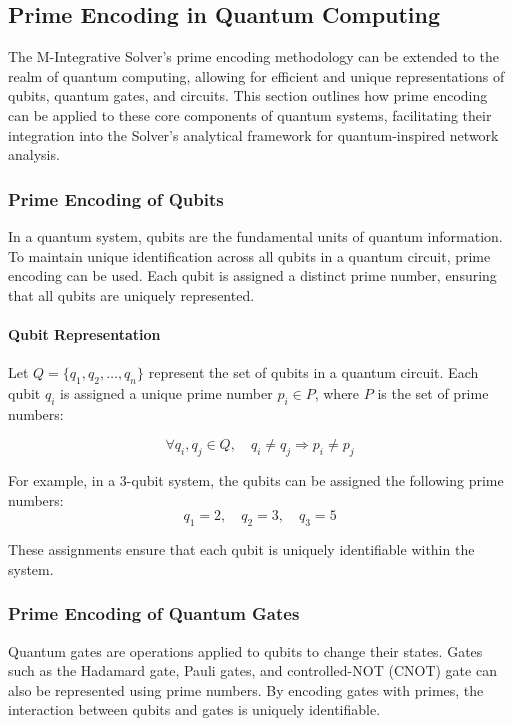 \documentclass[%
 preprint, linenumbers,
 amsmath,amssymb,
 aps, physrev,
]{revtex4-2}
\begin{document}
\subsection{Prime Encoding in Quantum Computing}

The M-Integrative Solver’s prime encoding methodology can be extended to the realm of quantum computing, allowing for efficient and unique representations of qubits, quantum gates, and circuits. This section outlines how prime encoding can be applied to these core components of quantum systems, facilitating their integration into the Solver’s analytical framework for quantum-inspired network analysis.

\subsubsection{Prime Encoding of Qubits}

In a quantum system, qubits are the fundamental units of quantum information. To maintain unique identification across all qubits in a quantum circuit, prime encoding can be used. Each qubit is assigned a distinct prime number, ensuring that all qubits are uniquely represented.

\paragraph{Qubit Representation}

Let \( Q = \{q_1, q_2, \dots, q_n\} \) represent the set of qubits in a quantum circuit. Each qubit \( q_i \) is assigned a unique prime number \( p_i \in P \), where \( P \) is the set of prime numbers:

\[
\forall q_i, q_j \in Q, \quad q_i \neq q_j \Rightarrow p_i \neq p_j
\]

For example, in a 3-qubit system, the qubits can be assigned the following prime numbers:
\[
q_1 = 2, \quad q_2 = 3, \quad q_3 = 5
\]

These assignments ensure that each qubit is uniquely identifiable within the system.

\subsubsection{Prime Encoding of Quantum Gates}

Quantum gates are operations applied to qubits to change their states. Gates such as the Hadamard gate, Pauli gates, and controlled-NOT (CNOT) gate can also be represented using prime numbers. By encoding gates with primes, the interaction between qubits and gates is uniquely identifiable.
\end{document}

